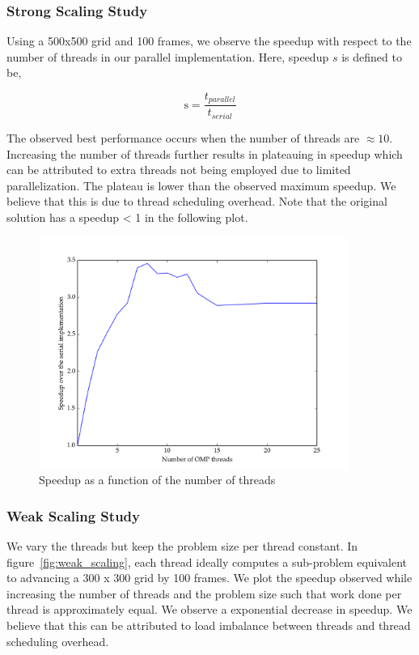 \documentclass[11pt]{article}
\begin{document}
\subsubsection{Strong Scaling Study}
Using a 500x500 grid and 100 frames, we observe the speedup with respect to the number of threads in our parallel implementation. Here, speedup $s$ is defined to be,  

\begin{equation}
	\mathrm{s} = \dfrac{t_{parallel}}{t_{serial}}
\end{equation}

The observed best performance occurs when the number of threads are $\approx10$. Increasing the number of threads further results in plateauing in speedup which can be attributed to extra threads not being employed due to limited parallelization. The plateau is lower than the observed maximum speedup. We believe that this is due to thread scheduling overhead. Note that the original solution has a speedup < 1 in the following plot. 

\begin{figure}[H]
    \includegraphics[width=0.9\textwidth]{./strong_scaling/strong_scaling.png}
    \caption{Speedup as a function of the number of threads}
    \label{fig:strong_scaling}
\end{figure} 


\subsubsection{Weak Scaling Study}

We vary the threads but keep the problem size per thread constant. In figure~\ref{fig:weak_scaling}, each thread ideally computes a sub-problem equivalent to advancing a 300 x 300 grid by 100 frames. We 
plot the speedup observed while increasing the number of threads and the problem size such that work done per thread is approximately equal. We observe a exponential decrease in speedup. We believe that this can be attributed to load imbalance between threads and thread scheduling overhead. 
\end{document}
